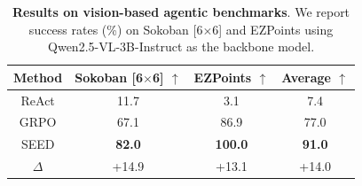 
\begin{table}[ht!]
\centering
\caption{\textbf{Results on vision-based agentic benchmarks}. We report
success rates (\%) on Sokoban [6$\times$6] and EZPoints using
Qwen2.5-VL-3B-Instruct as the backbone model.}
\label{tab:vlm_success_rates}
\vspace{0.05in}

\small
\setlength{\tabcolsep}{18pt}
\renewcommand{\arraystretch}{1.12}

\begin{tabular}{cccc}
\toprule
\textbf{Method}
& \textbf{Sokoban [6$\times$6] $\uparrow$}
& \textbf{EZPoints $\uparrow$}
& \textbf{Average $\uparrow$} \\
\midrule

ReAct
& 11.7
& 3.1
& 7.4 \\

GRPO
& 67.1
& 86.9
& 77.0 \\

\rowcolor{gray!12}
SEED
& \textbf{82.0}
& \textbf{100.0}
& \textbf{91.0} \\

\rowcolor{blue!6}
$\Delta$
& +14.9
& +13.1
& +14.0 \\

\bottomrule
\end{tabular}
\end{table}
